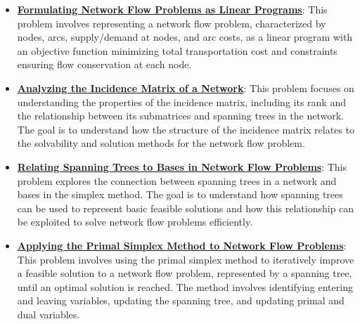 \documentclass{article}%
\begin{document}
\begin{itemize}[leftmargin=*]%
\item \href{https://www.math.purdue.edu/~yipn/421/2024-11-05-NetFlows.pdf#page=2}{\textbf{Formulating Network Flow Problems as Linear Programs}}: This problem involves representing a network flow problem, characterized by nodes, arcs, supply/demand at nodes, and arc costs, as a linear program with an objective function minimizing total transportation cost and constraints ensuring flow conservation at each node.%
\item \href{https://www.math.purdue.edu/~yipn/421/2024-11-05-NetFlows.pdf#page=6}{\textbf{Analyzing the Incidence Matrix of a Network}}: This problem focuses on understanding the properties of the incidence matrix, including its rank and the relationship between its submatrices and spanning trees in the network. The goal is to understand how the structure of the incidence matrix relates to the solvability and solution methods for the network flow problem.%
\item \href{https://www.math.purdue.edu/~yipn/421/2024-11-05-NetFlows.pdf#page=10}{\textbf{Relating Spanning Trees to Bases in Network Flow Problems}}: This problem explores the connection between spanning trees in a network and bases in the simplex method. The goal is to understand how spanning trees can be used to represent basic feasible solutions and how this relationship can be exploited to solve network flow problems efficiently.%
\item \href{https://www.math.purdue.edu/~yipn/421/2024-11-05-NetFlows.pdf#page=22}{\textbf{Applying the Primal Simplex Method to Network Flow Problems}}: This problem involves using the primal simplex method to iteratively improve a feasible solution to a network flow problem, represented by a spanning tree, until an optimal solution is reached. The method involves identifying entering and leaving variables, updating the spanning tree, and updating primal and dual variables.%
\end{itemize}%
\end{document}
